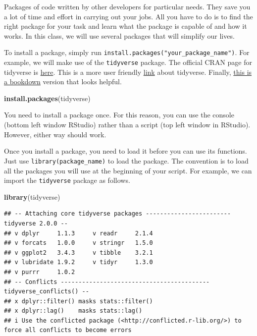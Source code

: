 \documentclass[
]{book}
\newenvironment{Shaded}{\begin{snugshade}}{\end{snugshade}}
\newcommand{\FunctionTok}[1]{\textcolor[rgb]{0.13,0.29,0.53}{\textbf{#1}}}
\newcommand{\NormalTok}[1]{#1}
\newcommand{\StringTok}[1]{\textcolor[rgb]{0.31,0.60,0.02}{#1}}
\begin{document}
Packages of code written by other developers for particular needs. They save you a lot of time and effort in carrying out your jobs. All you have to do is to find the right package for your task and learn what the package is capable of and how it works. In this class, we will use several packages that will simplify our lives.

To install a package, simply run \texttt{install.packages("your\_package\_name")}. For example, we will make use of the \texttt{tidyverse} package. The official CRAN page for tidyverse is \href{https://cran.r-project.org/package=tidyverse}{here}. This is a more user friendly \href{https://www.tidyverse.org}{link} about tidyverse. Finally, \href{https://bookdown.org/yih_huynh/Guide-to-R-Book/tidyverse.html}{this is a bookdown} version that looks helpful.

\begin{Shaded}
\begin{Highlighting}[]
\FunctionTok{install.packages}\NormalTok{(}\StringTok{\textquotesingle{}tidyverse\textquotesingle{}}\NormalTok{)}
\end{Highlighting}
\end{Shaded}

You need to install a package once. For this reason, you can use the console (bottom left window RStudio) rather than a script (top left window in RStudio). However, either way should work.

Once you install a package, you need to load it before you can use its functions. Just use \texttt{library(package\_name)} to load the package. The convention is to load all the packages you will use at the beginning of your script. For example, we can import the \texttt{tidyverse} package as follows.

\begin{Shaded}
\begin{Highlighting}[]
\FunctionTok{library}\NormalTok{(tidyverse)}
\end{Highlighting}
\end{Shaded}

\begin{verbatim}
## -- Attaching core tidyverse packages ------------------------ tidyverse 2.0.0 --
## v dplyr     1.1.3     v readr     2.1.4
## v forcats   1.0.0     v stringr   1.5.0
## v ggplot2   3.4.3     v tibble    3.2.1
## v lubridate 1.9.2     v tidyr     1.3.0
## v purrr     1.0.2     
## -- Conflicts ------------------------------------------ tidyverse_conflicts() --
## x dplyr::filter() masks stats::filter()
## x dplyr::lag()    masks stats::lag()
## i Use the conflicted package (<http://conflicted.r-lib.org/>) to force all conflicts to become errors
\end{verbatim}
\end{document}
